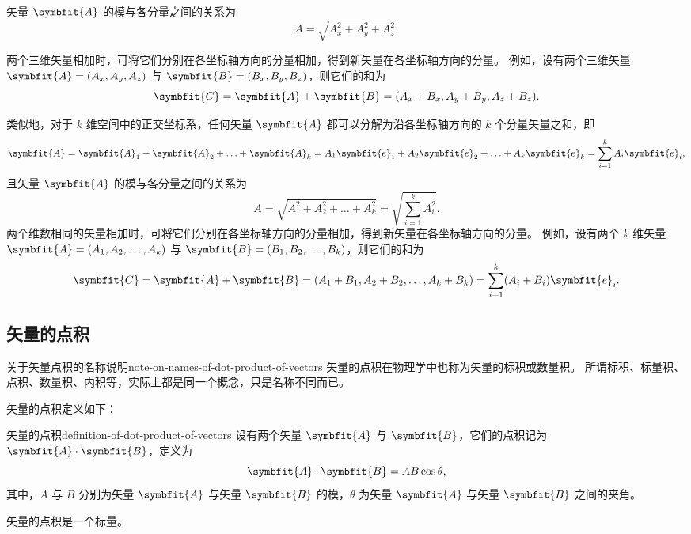 矢量 $ \symbfit{A} $ 的模与各分量之间的关系为
\begin{equation}
    A = \sqrt{A_x^2 + A_y^2 + A_z^2} .
\end{equation}

两个三维矢量相加时，可将它们分别在各坐标轴方向的分量相加，得到新矢量在各坐标轴方向的分量。
例如，设有两个三维矢量 $ \symbfit{A} = (A_x , A_y , A_z) $ 与 $ \symbfit{B} = (B_x , B_y , B_z) $，则它们的和为
\begin{equation}
    \symbfit{C} = \symbfit{A} + \symbfit{B} = (A_x + B_x , A_y + B_y , A_z + B_z) .
\end{equation}

\bigskip

类似地，对于 $ k $ 维空间中的正交坐标系，任何矢量 $ \symbfit{A} $ 都可以分解为沿各坐标轴方向的 $ k $ 个分量矢量之和，即
\begin{equation}
    \symbfit{A} = \symbfit{A}_1 + \symbfit{A}_2 + \ldots + \symbfit{A}_k = A_1 \symbfit{e}_1 + A_2 \symbfit{e}_2 + \ldots + A_k \symbfit{e}_k = \sum_{i=1}^{k} A_i \symbfit{e}_i ,
\end{equation}
且矢量 $ \symbfit{A} $ 的模与各分量之间的关系为
\begin{equation}
    A = \sqrt{A_1^2 + A_2^2 + \ldots + A_k^2} = \sqrt{\sum_{i=1}^{k} A_i^2} .
\end{equation}
两个维数相同的矢量相加时，可将它们分别在各坐标轴方向的分量相加，得到新矢量在各坐标轴方向的分量。
例如，设有两个 $ k $ 维矢量 $ \symbfit{A} = (A_1 , A_2 , \ldots , A_k) $ 与 $ \symbfit{B} = (B_1 , B_2 , \ldots , B_k) $，则它们的和为
\begin{equation}
    \symbfit{C} = \symbfit{A} + \symbfit{B} = (A_1 + B_1 , A_2 + B_2 , \ldots , A_k + B_k) = \sum_{i=1}^{k} (A_i + B_i) \symbfit{e}_i .
\end{equation}

\subsection{矢量的点积}\label{subsec:dot-product-of-vectors}

\begin{note}{关于矢量点积的名称说明}{note-on-names-of-dot-product-of-vectors}
    矢量的点积在物理学中也称为矢量的标积或数量积。
    所谓标积、标量积、点积、数量积、内积等，实际上都是同一个概念，只是名称不同而已。
\end{note}

矢量的点积定义如下：
\begin{definition}{矢量的点积}{definition-of-dot-product-of-vectors}
    设有两个矢量 $ \symbfit{A} $ 与 $ \symbfit{B} $，它们的点积记为 $ \symbfit{A} \cdot \symbfit{B} $，定义为
    \begin{equation}
        \symbfit{A} \cdot \symbfit{B} = AB \cos \theta ,
    \end{equation}
    其中，$ A $ 与 $ B $ 分别为矢量 $ \symbfit{A} $ 与矢量 $ \symbfit{B} $ 的模，$ \theta $ 为矢量 $ \symbfit{A} $ 与矢量 $ \symbfit{B} $ 之间的夹角。
\end{definition}
矢量的点积是一个标量。

